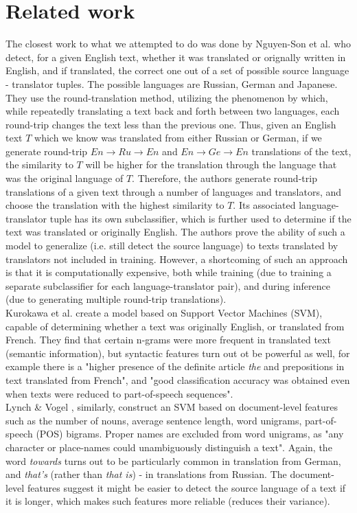 \documentclass[twocolumn]{article}
\begin{document}
\section*{Related work}

The closest work to what we attempted to do was done by Nguyen-Son et al. \cite{roundtrip} who detect, for a given English text, whether it was translated or orignally written in English, and if translated, the correct one out of a set of possible source language - translator tuples. The possible languages are Russian, German and Japanese. They use the round-translation method, utilizing the phenomenon by which, while repeatedly translating a text back and forth between two languages, each round-trip changes the text less than the previous one. Thus, given an English text $T$ which we know was translated from either Russian or German, if we generate round-trip $En \rightarrow Ru \rightarrow En$ and $En \rightarrow Ge \rightarrow En$ translations of the text, the similarity to $T$ will be higher for the translation through the language that was the original language of $T$. Therefore, the authors generate round-trip translations of a given text through a number of languages and translators, and choose the translation with the highest similarity to $T$. Its associated language-translator tuple has its own subclassifier, which is further used to determine if the text was translated or originally English. The authors prove the ability of such a model to generalize (i.e. still detect the source language) to texts translated by translators not included in training. However, a shortcoming of such an approach is that it is computationally expensive, both while training (due to training a separate subclassifier for each language-translator pair), and during inference (due to generating multiple round-trip translations).\\ \quad Kurokawa et al. \cite{canada} create a model based on Support Vector Machines (SVM), capable of determining whether a text was originally English, or translated from French. They find that certain n-grams were more frequent in translated text (semantic information), but syntactic features turn out ot be powerful as well, for example there is a "higher presence of the definite article \emph{the} and prepositions in text translated from French", and "good classification accuracy was obtained even when texts were reduced to part-of-speech sequences".\\ Lynch \& Vogel \cite{literary}, similarly, construct an SVM based on document-level features such as the number of nouns, average sentence length, word unigrams, part-of-speech (POS) bigrams. Proper names are excluded from word unigrams, as "any character or place-names could unambiguously distinguish a text". Again, the word \emph{towards} turns out to be particularly common in translation from German, and \emph{that's} (rather than \emph{that is}) - in translations from Russian. The document-level features suggest it might be easier to detect the source language of a text if it is longer, which makes such features more reliable (reduces their variance).
\end{document}
